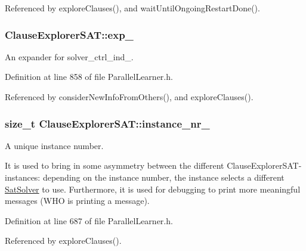 Referenced by explore\-Clauses(), and wait\-Until\-Ongoing\-Restart\-Done().

\hypertarget{classClauseExplorerSAT_a0e5087acddea2f2a7da1c298a93c40fa}{
\subsubsection[{exp\-\_\-}]{ Clause\-Explorer\-S\-A\-T\-::exp\-\_\-\hspace{0.3cm}{\ttfamily [protected]}}}\label{classClauseExplorerSAT_a0e5087acddea2f2a7da1c298a93c40fa}


An expander for solver\-\_\-ctrl\-\_\-ind\-\_\-. 



Definition at line 858 of file Parallel\-Learner.\-h.



Referenced by consider\-New\-Info\-From\-Others(), and explore\-Clauses().

\hypertarget{classClauseExplorerSAT_ab9ff4163b38a8ce70e07b78ea2e76cc2}{
\subsubsection[{instance\-\_\-nr\-\_\-}]{\setlength{\rightskip}{0pt plus 5cm}size\-\_\-t Clause\-Explorer\-S\-A\-T\-::instance\-\_\-nr\-\_\-\hspace{0.3cm}{\ttfamily [protected]}}}\label{classClauseExplorerSAT_ab9ff4163b38a8ce70e07b78ea2e76cc2}


A unique instance number. 

It is used to bring in some asymmetry between the different Clause\-Explorer\-S\-A\-T-\/instances\-: depending on the instance number, the instance selects a different \hyperlink{classSatSolver}{Sat\-Solver} to use. Furthermore, it is used for debugging to print more meaningful messages (W\-H\-O is printing a message). 

Definition at line 687 of file Parallel\-Learner.\-h.



Referenced by explore\-Clauses().

